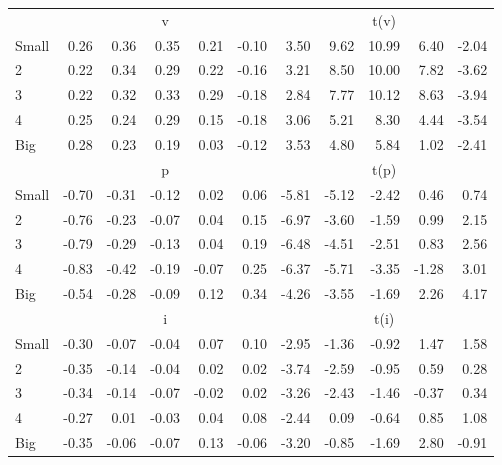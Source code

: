 \begin{table}[!ht]
\begin{tabular}{lrrrrrrrrrr}
  
    
      & \multicolumn{5}{c}{v} & \multicolumn{5}{c}{t(v)}
    
    \\
      \cmidrule(r){2-6} \cmidrule(r){7-11}

    Small   & 0.26  & 0.36  & 0.35  & 0.21  & -0.10  & 3.50  & 9.62  & 10.99  & 6.40  & -2.04  \\
         2  & 0.22  & 0.34  & 0.29  & 0.22  & -0.16  & 3.21  & 8.50  & 10.00  & 7.82  & -3.62  \\
         3  & 0.22  & 0.32  & 0.33  & 0.29  & -0.18  & 2.84  & 7.77  & 10.12  & 8.63  & -3.94  \\
         4  & 0.25  & 0.24  & 0.29  & 0.15  & -0.18  & 3.06  & 5.21  & 8.30  & 4.44  & -3.54  \\
    Big     & 0.28  & 0.23  & 0.19  & 0.03  & -0.12  & 3.53  & 4.80  & 5.84  & 1.02  & -2.41  \\

  
    
      & \multicolumn{5}{c}{p} & \multicolumn{5}{c}{t(p)}
    
    \\
      \cmidrule(r){2-6} \cmidrule(r){7-11}

    Small   & -0.70  & -0.31  & -0.12  & 0.02  & 0.06  & -5.81  & -5.12  & -2.42  & 0.46  & 0.74  \\
         2  & -0.76  & -0.23  & -0.07  & 0.04  & 0.15  & -6.97  & -3.60  & -1.59  & 0.99  & 2.15  \\
         3  & -0.79  & -0.29  & -0.13  & 0.04  & 0.19  & -6.48  & -4.51  & -2.51  & 0.83  & 2.56  \\
         4  & -0.83  & -0.42  & -0.19  & -0.07  & 0.25  & -6.37  & -5.71  & -3.35  & -1.28  & 3.01  \\
    Big     & -0.54  & -0.28  & -0.09  & 0.12  & 0.34  & -4.26  & -3.55  & -1.69  & 2.26  & 4.17  \\

  
    
      & \multicolumn{5}{c}{i} & \multicolumn{5}{c}{t(i)}
    
    \\
      \cmidrule(r){2-6} \cmidrule(r){7-11}

    Small   & -0.30  & -0.07  & -0.04  & 0.07  & 0.10  & -2.95  & -1.36  & -0.92  & 1.47  & 1.58  \\
         2  & -0.35  & -0.14  & -0.04  & 0.02  & 0.02  & -3.74  & -2.59  & -0.95  & 0.59  & 0.28  \\
         3  & -0.34  & -0.14  & -0.07  & -0.02  & 0.02  & -3.26  & -2.43  & -1.46  & -0.37  & 0.34  \\
         4  & -0.27  & 0.01  & -0.03  & 0.04  & 0.08  & -2.44  & 0.09  & -0.64  & 0.85  & 1.08  \\
    Big     & -0.35  & -0.06  & -0.07  & 0.13  & -0.06  & -3.20  & -0.85  & -1.69  & 2.80  & -0.91  \\


  \bottomrule
\end{tabular}
\label{tbl:25_Size_Prior_B2016}
\end{table}